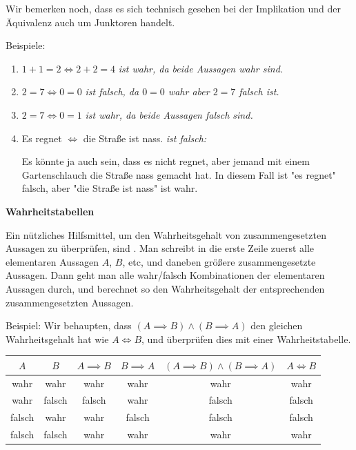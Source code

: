 Wir bemerken noch, dass es sich technisch gesehen bei der Implikation und der Äquivalenz auch um Junktoren handelt.

\begin{example}
    Beispiele:
    \begin{enumerate}
        \item $1 + 1 = 2 \iff 2 + 2 = 4$ \emph{ist wahr, da beide Aussagen wahr sind.}
        \item $2 = 7 \iff 0 = 0$ \emph{ist falsch, da $0 = 0$ wahr aber $2 = 7$ falsch ist.}
        \item $2 = 7 \iff 0 = 1$ \emph{ist wahr, da beide Aussagen falsch sind.}
        \item Es regnet $\iff$ die Straße ist nass. \hfill \emph{ist falsch:}

        Es könnte ja auch sein, dass es nicht regnet, aber jemand mit einem Gartenschlauch die Straße nass gemacht hat. In diesem Fall ist "es regnet" falsch, aber "die Straße ist nass" ist wahr.
    \end{enumerate}
\end{example}

\begin{remark}
    \textbf{Wahrheitstabellen}
    
    Ein nützliches Hilfsmittel, um den Wahrheitsgehalt von zusammengesetzten Aussagen zu überprüfen, sind . Man schreibt in die erste Zeile zuerst alle elementaren Aussagen $A$, $B$, etc, und daneben größere zusammengesetzte Aussagen. Dann geht man alle wahr/falsch Kombinationen der elementaren Aussagen durch, und berechnet so den Wahrheitsgehalt der entsprechenden zusammengesetzten Aussagen.

    Beispiel: Wir behaupten, dass $(A \implies B) \land (B \implies A)$ den gleichen Wahrheitsgehalt hat wie $A \iff B$, und überprüfen dies mit einer Wahrheitstabelle.

    \begin{center}
        \begin{tabular}{|c|c||c|c|c||c|}
            \hline
            $A$ & $B$ & $A \implies B$ & $B \implies A$ & $(A \implies B) \land (B \implies A)$ & $A \iff B$\\
            \hline\hline
            wahr & wahr & wahr & wahr & wahr & wahr\\
            \hline
            wahr & falsch & falsch & wahr & falsch & falsch\\
            \hline
            falsch & wahr & wahr & falsch & falsch & falsch\\
            \hline
            falsch & falsch & wahr & wahr & wahr & wahr\\
            \hline
        \end{tabular}
    \end{center}
\end{remark}

